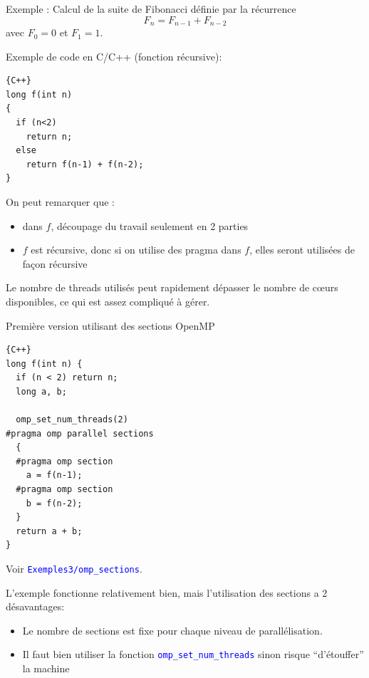 \documentclass{beamer}
\begin{document}
\begin{frame}[fragile]
Exemple : Calcul de la suite de Fibonacci définie par la récurrence
$$
F_n = F_{n-1} + F_{n-2}
$$
avec $F_0 = 0$ et $F_1 = 1$.

\vfill
Exemple de code en C/C++ (fonction récursive):
 

\begin{lstlisting}{C++}
long f(int n)
{
  if (n<2)
    return n;
  else
    return f(n-1) + f(n-2);
}
\end{lstlisting}

\end{frame}

\begin{frame}[fragile]
\vfill
	On peut remarquer que :
	\begin{itemize}
		\item dans $f$, découpage du travail seulement en 2 parties
		\item $f$ est récursive, donc si on utilise des pragma dans $f$, elles seront utilisées de façon récursive
	\end{itemize}

\bigskip
Le nombre de threads utilisés peut rapidement dépasser le nombre de c\oe urs disponibles, ce qui est assez compliqué à gérer.
\vfill
\end{frame}

\begin{frame}[fragile]
	Première version utilisant des sections OpenMP
	
\begin{lstlisting}{C++}
long f(int n) {
  if (n < 2) return n;
  long a, b;
  
  omp_set_num_threads(2)
#pragma omp parallel sections
  {
  #pragma omp section
    a = f(n-1);		
  #pragma omp section
    b = f(n-2);
  }
  return a + b;
}
\end{lstlisting}

\vspace{-2cm}\hfill{}
\end{frame}

\begin{frame}
	\vfill

	Voir {\tt\textcolor{blue}{Exemples3/omp\_sections}}.
	\vfill
	
	L'exemple fonctionne relativement bien, mais l'utilisation des sections a 2 désavantages:
	
	\begin{itemize}
		\item Le nombre de sections est fixe pour chaque niveau de parallélisation.
		\item Il faut bien utiliser la fonction {\tt\textcolor{blue}{omp\_set\_num\_threads}} sinon risque ``d'étouffer'' la machine
	\end{itemize}

	\vfill
\end{frame}
\end{document}
